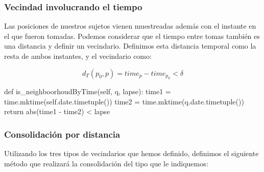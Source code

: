 \documentclass[10pt, spanish]{beamer}
\begin{document}
\begin{frame}[fragile]
\frametitle{Vecindad involucrando el tiempo}
Las posiciones de nuestros sujetos vienen muestreadas adem\'as con el instante en el que fueron tomadas. Podemos considerar que el tiempo entre tomas tambi\'en es una distancia y definir un vecindario. Definimos esta distancia temporal como la resta de ambos instantes, y el vecindario como: 

$$ d_T(p_0, p) = time_p - time_{p_0} < \delta $$

\bigskip

\begin{python}
	def is_neighboorhoudByTime(self, q, lapse):
		time1 = time.mktime(self.date.timetuple())
		time2 = time.mktime(q.date.timetuple())
		return abs(time1 - time2) < lapse
\end{python}

\end{frame}

\begin{frame}[fragile]
\frametitle{Consolidaci\'on por distancia}
Utilizando los tres tipos de vecindarios que hemos definido, definimos el
siguiente m\'etodo que realizará la consolidaci\'on del tipo que le indiquemos:\\

\bigskip

\begin{algorithmic}[1]
        \Else
        \EndIf
\EndFor
\EndFunction
\end{algorithmic}
\end{frame}
\end{document}
